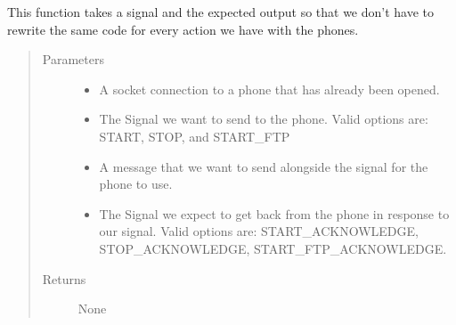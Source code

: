 \documentclass[letterpaper,10pt,english]{sphinxmanual}
\begin{document}
\begin{fulllineitems}
\begin{fulllineitems}
\begin{quote}
\begin{description}
\end{description}\end{quote}

\end{fulllineitems}


\begin{fulllineitems}
\label{\detokenize{index:src.Controllers.PhoneController.PhoneControl.threadSendSignal}}
This function takes a signal and the expected output so that we don’t have to rewrite the same code for
every action we have with the phones.
\begin{quote}\begin{description}
\item[{Parameters}] \leavevmode\begin{itemize}
\item {} 
 \textendash{} A socket connection to a phone that has already been opened.

\item {} 
 \textendash{} The Signal we want to send to the phone. Valid options are: START, STOP, and START\_FTP

\item {} 
 \textendash{} A message that we want to send alongside the signal for the phone to use.

\item {} 
 \textendash{} The Signal we expect to get back from the phone in response to our signal. Valid options are: START\_ACKNOWLEDGE, STOP\_ACKNOWLEDGE, START\_FTP\_ACKNOWLEDGE.

\end{itemize}

\item[{Returns}] \leavevmode
None

\end{description}\end{quote}

\end{fulllineitems}


\end{fulllineitems}
\end{document}

